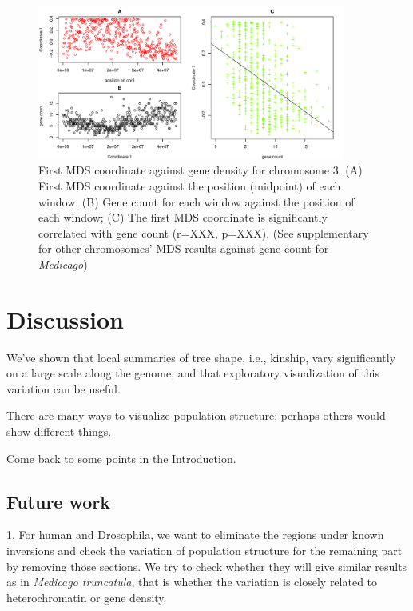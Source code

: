 \documentclass[11pt, oneside]{article}   	%
\begin{document}
\begin{figure}
    \begin{center}
       \includegraphics[width=0.9\textwidth]{Fig6_MDS_1D_and_gene_count_and_lm_chr3_based_all_chr_win104}
    \end{center}
    \caption{
        First MDS coordinate against gene density for chromosome 3. 
        (A) First MDS coordinate against the position (midpoint) of each window. 
        (B) Gene count for each window against the position of each window; 
        (C) The first MDS coordinate is significantly correlated with gene count (r=XXX, p=XXX). 
        (See supplementary for other chromosomes' MDS results against gene count for \textit{Medicago})
        \label{fig:mds_gene_count}
    }
\end{figure}

\section{Discussion}

We've shown that local summaries of tree shape, i.e., kinship, vary significantly on a large scale along the genome,
and that exploratory visualization of this variation can be useful.

There are many ways to visualize population structure; perhaps others would show different things.

Come back to some points in the Introduction.

\subsection{Future work}
1. For human and Drosophila, we want to eliminate the regions under known inversions and check the variation of population structure for the remaining part by removing those sections. We try to check whether they will give similar results as in \textit{Medicago truncatula}, that is whether the variation is closely related to heterochromatin or gene density.
\end{document}
